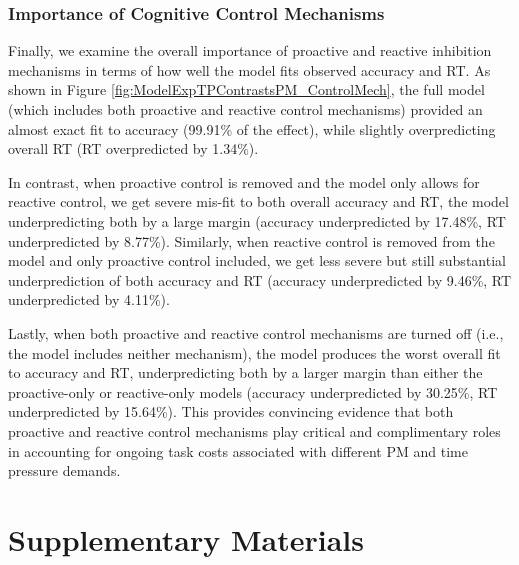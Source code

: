 \documentclass[11pt,]{article}
\begin{document}
\subsubsection{Importance of Cognitive Control
Mechanisms}\label{importance-of-cognitive-control-mechanisms}

Finally, we examine the overall importance of proactive and reactive
inhibition mechanisms in terms of how well the model fits observed
accuracy and RT. As shown in Figure
\ref{fig:ModelExpTPContrastsPM_ControlMech}, the full model (which
includes both proactive and reactive control mechanisms) provided an
almost exact fit to accuracy (99.91\% of the effect), while slightly
overpredicting overall RT (RT overpredicted by 1.34\%).

In contrast, when proactive control is removed and the model only allows
for reactive control, we get severe mis-fit to both overall accuracy and
RT, the model underpredicting both by a large margin (accuracy
underpredicted by 17.48\%, RT underpredicted by 8.77\%). Similarly, when
reactive control is removed from the model and only proactive control
included, we get less severe but still substantial underprediction of
both accuracy and RT (accuracy underpredicted by 9.46\%, RT
underpredicted by 4.11\%).

Lastly, when both proactive and reactive control mechanisms are turned
off (i.e., the model includes neither mechanism), the model produces the
worst overall fit to accuracy and RT, underpredicting both by a larger
margin than either the proactive-only or reactive-only models (accuracy
underpredicted by 30.25\%, RT underpredicted by 15.64\%). This provides
convincing evidence that both proactive and reactive control mechanisms
play critical and complimentary roles in accounting for ongoing task
costs associated with different PM and time pressure demands.

\section{Supplementary Materials}\label{supplementary-materials}
\end{document}
